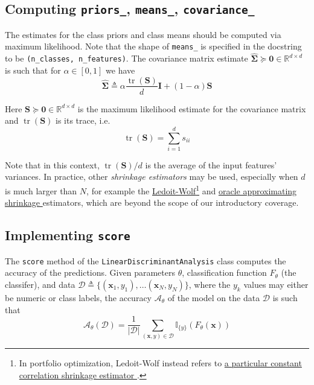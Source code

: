 \documentclass{article}
\numberwithin{equation}{section}
\newcommand{\tr}{\operatorname{tr}}
\begin{document}
\subsection{%
    Computing \texttt{priors\_}, \texttt{means\_}, \texttt{covariance\_}%
}

The estimates for the class priors and class means should be computed via
maximum likelihood. Note that the shape of \texttt{means\_} is specified in
the docstring to be \texttt{(n\_classes, n\_features)}. The covariance matrix
estimate $ \hat{\mathbf{\Sigma}} \succeq \mathbf{0} \in
\mathbb{R}^{d \times d} $ is such that for $ \alpha \in [0, 1] $ we have
\begin{equation} \label{cov_est}
    \hat{\mathbf{\Sigma}} \triangleq \alpha\frac{\tr(\mathbf{S})}{d}\mathbf{I}
        + (1 - \alpha)\mathbf{S}
\end{equation}

Here $ \mathbf{S} \succeq \mathbf{0} \in \mathbb{R}^{d \times d} $ is the
maximum likelihood estimate for the covariance matrix and
$ \tr(\mathbf{S}) $ is its trace, i.e.
\begin{equation*}
    \tr(\mathbf{S}) = \sum_{i = 1}^ds_{ii}
\end{equation*}

Note that in this context, $ \tr(\mathbf{S}) / d $ is the average of the
input features' variances. In practice, other \textit{shrinkage estimators}
may be used, especially when $ d $ is much larger than $ N $, for example
the \href{http://www.ledoit.net/ole1a.pdf}{Ledoit-Wolf}\footnote{
    In portfolio optimization, Ledoit-Wolf instead refers to
    \href{http://www.ledoit.net/honey.pdf}{%
        a particular constant correlation shrinkage estimator%
    }.
} and
\href{https://arxiv.org/pdf/0907.4698.pdf}{%
    oracle approximating shrinkage%
} estimators, which are beyond the scope of our introductory coverage.

\subsection{Implementing \texttt{score}}

The \texttt{score} method of the \texttt{LinearDiscriminantAnalysis} class
computes the accuracy of the predictions. Given parameters $ \theta $,
classification function $ F_\theta $ (the classifer), and data
$ \mathcal{D} \triangleq \{(\mathbf{x}_1, y_1), \ldots (\mathbf{x}_N, y_N)\} $,
where the $ y_k $ values may either be numeric or class labels, the accuracy
$ \mathcal{A}_\theta $ of the model on the data $ \mathcal{D} $ is such that
\begin{equation*}
    \mathcal{A}_\theta(\mathcal{D}) = \frac{1}{|\mathcal{D}|}
        \sum_{(\mathbf{x}, y) \in \mathcal{D}}\mathbb{I}_{\{y\}}\left(
            F_\theta(\mathbf{x})
        \right)
\end{equation*}
\end{document}
